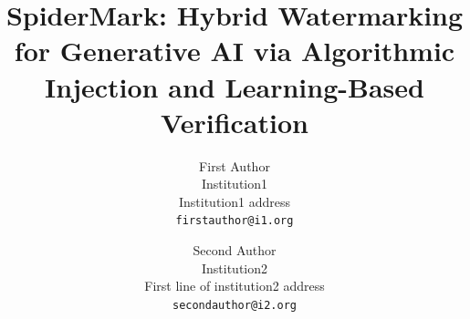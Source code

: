 \documentclass[10pt,twocolumn,letterpaper]{article}
\title{SpiderMark: Hybrid Watermarking for Generative AI via Algorithmic Injection and Learning-Based Verification}
\author{First Author\\
Institution1\\
Institution1 address\\
{\tt\small firstauthor@i1.org}
\and
Second Author\\
Institution2\\
First line of institution2 address\\
{\tt\small secondauthor@i2.org}
}
\begin{document}
\maketitle
    

%





{
    \small
    
    
}

% 
\end{document}
